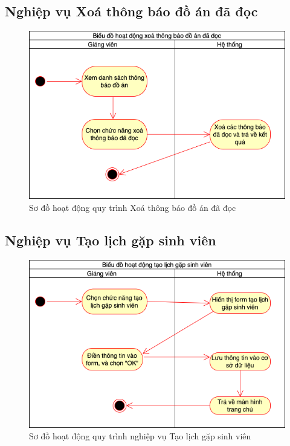 \documentclass[../Main.tex]{subfiles}
\begin{document}
\subsection{Nghiệp vụ Xoá thông báo đồ án đã đọc}
\begin{figure}[H]
   \centering
    \includegraphics[width=0.85\linewidth]{Figure/qt_xoa_thong_bao.png}
    \caption{Sơ đồ hoạt động quy trình Xoá thông báo đồ án đã đọc}
    \label{fig:qt_xoa_thong_bao}
\end{figure}
\newpage
\subsection{Nghiệp vụ Tạo lịch gặp sinh viên}
\begin{figure}[H]
   \centering
    \includegraphics[width=0.75\linewidth]{Figure/qt_meeting.png}
    \caption{Sơ đồ hoạt động quy trình nghiệp vụ Tạo lịch gặp sinh viên}
    \label{fig:qt_meeting}
\end{figure}
\end{document}
